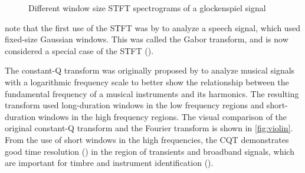 \documentclass[report.tex]{subfiles}
\begin{document}
\begin{figure}[ht]
	\centering
	\hspace{0.5em}
	\caption{Different window size STFT spectrograms of a glockenspiel signal}
	\label{fig:stfttradeoff}
\end{figure}

\textcite{dictionary} note that the first use of the STFT was by \textcite{gabor1946} to analyze a speech signal, which used fixed-size Gaussian windows. This was called the Gabor transform, and is now considered a special case of the STFT (\cite{dictionary}).

The constant-Q transform was originally proposed by \textcite{jbrown} to analyze musical signals with a logarithmic frequency scale to better show the relationship between the fundamental frequency of a musical instruments and its harmonics. The resulting transform used long-duration windows in the low frequency regions and short-duration windows in the high frequency regions. The visual comparison of the original constant-Q transform and the Fourier transform is shown in \ref{fig:violin}. From the use of short windows in the high frequencies, the CQT demonstrates good time resolution (\cite{cqtransient}) in the region of transients and broadband signals, which are important for timbre and instrument identification (\cite{timbretransients1, timbretransients2}).
\end{document}
